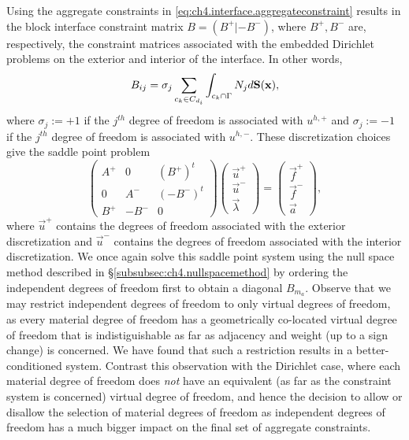 Using the aggregate constraints in \eqref{eq:ch4.interface.aggregateconstraint} results in the block interface constraint matrix $B = (B^+ | {-B^-})$, where $B^+, B^-$ are, respectively, the constraint matrices associated with the embedded Dirichlet problems on the exterior and interior of the interface. In other words,
\begin{equation} \label{eq:ch4.interface.aggregateconstraint.matrix}
B_{ij} = \sigma_j \sum_{c_k \in C_{d_i}} \int_{c_k \cap \Gamma} N_j d\mathbf{S}(\mathbf{x}),
\end{equation}
where $\sigma_j := +1$ if the $j^{th}$ degree of freedom is associated with $u^{h,+}$ and $\sigma_j := -1$ if the $j^{th}$ degree of freedom is associated with $u^{h,-}$. These discretization choices give the saddle point problem
\begin{equation} \label{eq:ch4.interface.kkt}
\begin{pmatrix} A^+ & 0 & (B^+)^t \\ 0 & A^- & (-B^-)^t \\ B^+ & -B^- & 0 \end{pmatrix}
\begin{pmatrix} \vec{u}^+ \\ \vec{u}^- \\ \vec{\lambda} \end{pmatrix}
= \begin{pmatrix} \vec{f}^+ \\ \vec{f}^- \\ \vec{a} \end{pmatrix},
\end{equation}
where $\vec{u}^+$ contains the degrees of freedom associated with the exterior discretization and $\vec{u}^-$ contains the degrees of freedom associated with the interior discretization. We once again solve this saddle point system using the null space method described in \S\ref{subsubsec:ch4.nullspacemethod} by ordering the independent degrees of freedom first to obtain a diagonal $B_{m_a}$. Observe that we may restrict independent degrees of freedom to only virtual degrees of freedom, as every material degree of freedom has a geometrically co-located virtual degree of freedom that is indistiguishable as far as adjacency and weight (up to a sign change) is concerned. We have found that such a restriction results in a better-conditioned system. Contrast this observation with the Dirichlet case, where each material degree of freedom does \emph{not} have an equivalent (as far as the constraint system is concerned) virtual degree of freedom, and hence the decision to allow or disallow the selection of material degrees of freedom as independent degrees of freedom has a much bigger impact on the final set of aggregate constraints.

